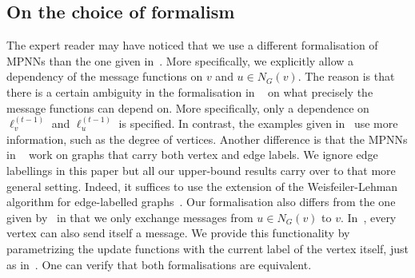 \subsection{On the choice of formalism}
The expert reader may have noticed that we use a different formalisation of MPNNs than the one given in~\cite{GilmerSRVD17}. More specifically, we explicitly allow a dependency of the message functions on $v$ and $u\in N_G(v)$. The reason is that there is a certain ambiguity in the formalisation in ~\cite{GilmerSRVD17} on what precisely the message functions can depend on. More specifically, only a dependence on  $\pmb{\ell}_v^{(t-1)}$ and $\pmb{\ell}_u^{(t-1)}$
is specified. In contrast, the examples given in~\cite{GilmerSRVD17} use more information, such as the degree of vertices. Another difference is that the MPNNs in ~\cite{GilmerSRVD17} work on graphs that carry both vertex and edge labels. We ignore edge labellings in this paper but all our upper-bound results carry over to that more general setting. Indeed, it suffices to use the extension of the Weisfeiler-Lehman algorithm for edge-labelled graphs~\cite{Jaume2019}. Our formalisation also differs from the one given by~\cite{Loukas2019} in that we only exchange messages from $u\in N_G(v)$
to $v$. In~\cite{Loukas2019}, every vertex can also send itself a message. We provide this functionality by parametrizing the update functions with the current label of the vertex itself, just as in~\cite{GilmerSRVD17}. One can verify that both formalisations are equivalent.
